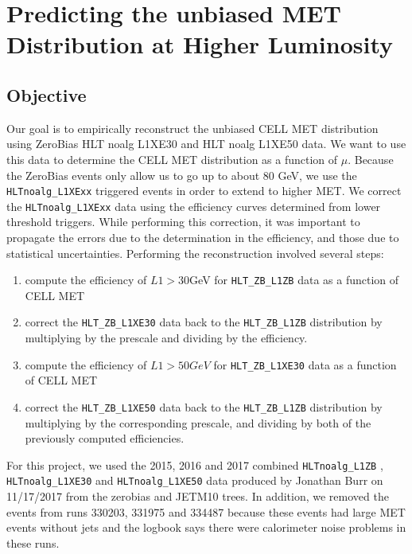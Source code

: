 \chapter{Predicting the unbiased MET Distribution at Higher Luminosity}
\section{Objective}
Our goal is to empirically reconstruct the unbiased CELL MET distribution using ZeroBias HLT noalg L1XE30 and HLT noalg L1XE50 data. 
We want to use this data to determine the CELL MET distribution as a function of $\mu$.
Because the ZeroBias events only allow us to go up to about $80$ GeV, we use the \texttt{HLTnoalg\_L1XExx} triggered events in order to extend to higher MET.
We correct the \texttt{HLTnoalg\_L1XExx} data using the efficiency curves determined from lower threshold triggers.
While performing this correction, it was important to propagate the errors due to the determination in the efficiency, and those due to statistical uncertainties.
Performing the reconstruction involved several steps:
\begin{enumerate}
        \item compute the efficiency of $L1>30$GeV for \texttt{HLT\_ZB\_L1ZB} data as a function of CELL MET
        \item correct the \texttt{HLT\_ZB\_L1XE30} data back to the \texttt{HLT\_ZB\_L1ZB} distribution by multiplying by the prescale and dividing by the efficiency. 
        \item compute the efficiency of $L1>50GeV$ for \texttt{HLT\_ZB\_L1XE30} data as a function of CELL MET
        \item correct the \texttt{HLT\_ZB\_L1XE50} data back to the \texttt{HLT\_ZB\_L1ZB} distribution by multiplying by the corresponding prescale, and dividing by both of the previously computed efficiencies. 
\end{enumerate}
For this project, we used the 2015, 2016 and 2017 combined \texttt{HLTnoalg\_L1ZB} , \texttt{HLTnoalg\_L1XE30} and \texttt{HLTnoalg\_L1XE50} data produced by Jonathan Burr on 11/17/2017 from the zerobias and JETM10 trees.
In addition, we removed the events from runs 330203, 331975 and 334487 because these events had large MET events without jets and the logbook says there were calorimeter noise problems in these runs. 

